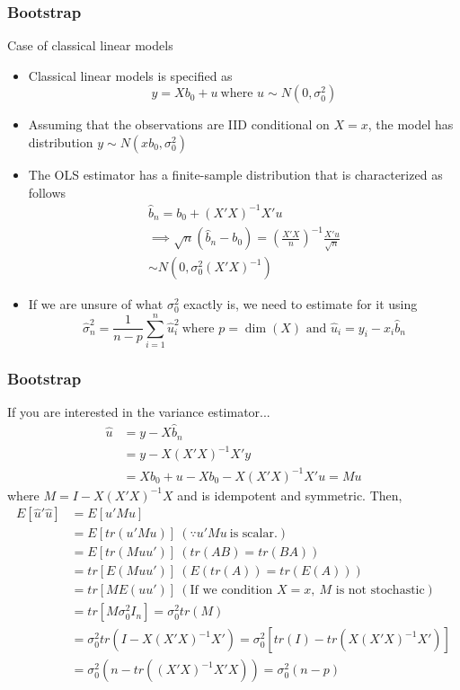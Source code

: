 \documentclass{beamer}
\begin{document}
\begin{frame}
\frametitle{Bootstrap}
Case of classical linear models
\begin{itemize}
\item Classical linear models is specified as
\[
y=Xb_0+u \ \text{where $u\sim N(0,\sigma_0^2)$}
\]
\item Assuming that the observations are IID conditional on $X=x$, the model has distribution $y\sim N(xb_0,\sigma_0^2)$
\item  The OLS estimator has a finite-sample distribution that is characterized as follows
\begin{gather*}
\hat{b}_n = b_0 + (X'X)^{-1}X'u\\
\implies \sqrt{n}(\hat{b}_n-b_0)=\left(\frac{X'X}{n}\right)^{-1}\frac{X'u}{\sqrt{n}}\\
\sim N(0,\sigma_0^2(X'X)^{-1})
\end{gather*}
\item If we are unsure of what $\sigma_0^2$ exactly is, we need to estimate for it using
\[
\hat{\sigma}_n^2 = \frac{1}{n-p}\sum_{i=1}^n \hat{u}_i^2 \ \text{where $p=\dim(X)$ and $\hat{u}_i = y_i - x_i\hat{b}_n$}
\]
\end{itemize}
\end{frame}

\begin{frame}
\frametitle{Bootstrap}
If you are interested in the variance estimator...
\begin{align*}
\hat{u} &= y-X\hat{b}_n\\
&=y-X(X'X)^{-1}X'y\\
&=Xb_0+u-Xb_0-X(X'X)^{-1}X'u = Mu 
\end{align*}
where $M=I-X(X'X)^{-1}X$ and is idempotent and symmetric. Then, 
\begin{align*}
E[\hat{u}'\hat{u}]&=E[u'Mu]\\
&=E[tr(u'Mu)] \ (\because u'Mu \ \text{is scalar.})\\
&=E[tr(Muu')] \ (tr(AB)=tr(BA))\\
&=tr[E(Muu')] \ (E(tr(A))=tr(E(A)))\\
&=tr[ME(uu')] \ (\text{If we condition }X=x,\ \text{$M$ is not stochastic})\\
&=tr[M \sigma_0^2 I_n] = \sigma_0^2 tr(M)\\
&=\sigma_0^2 tr(I-X(X'X)^{-1}X')=\sigma_0^2[tr(I)-tr(X(X'X)^{-1}X')]\\
&=\sigma_0^2(n-tr((X'X)^{-1}X'X)) = \sigma_0^2(n-p)
\end{align*}
\end{frame}
\end{document}
